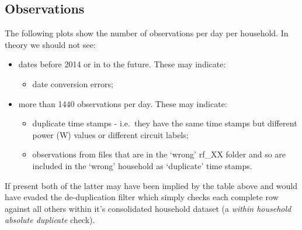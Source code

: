 \documentclass[]{article}
\providecommand{\tightlist}{%
  \setlength{\itemsep}{0pt}\setlength{\parskip}{0pt}}
\begin{document}
\subsection{Observations}\label{observations}

The following plots show the number of observations per day per
household. In theory we should not see:

\begin{itemize}
\tightlist
\item
  dates before 2014 or in to the future. These may indicate:

  \begin{itemize}
  \tightlist
  \item
    date conversion errors;
  \end{itemize}
\item
  more than 1440 observations per day. These may indicate:

  \begin{itemize}
  \tightlist
  \item
    duplicate time stamps - i.e.~they have the same time stamps but
    different power (W) values or different circuit labels;
  \item
    observations from files that are in the `wrong' rf\_XX folder and so
    are included in the `wrong' household as `duplicate' time stamps.
  \end{itemize}
\end{itemize}

If present both of the latter may have been implied by the table above
and would have evaded the de-duplication filter which simply checks each
complete row against all others within it's consolidated household
dataset (a \emph{within household absolute duplicate} check).
\end{document}
